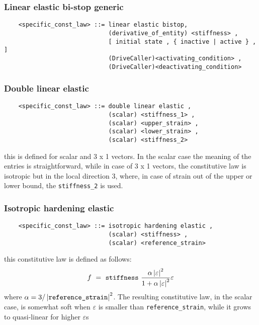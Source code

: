 \subsubsection{Linear elastic bi-stop generic}
\begin{verbatim}
    <specific_const_law> ::= linear elastic bistop,
                             (derivative_of_entity) <stiffness> ,
                             [ initial state , { inactive | active } , ]
                             (DriveCaller)<activating_condition> ,
                             (DriveCaller)<deactivating_condition>
\end{verbatim}
  
\subsubsection{Double linear elastic}
\begin{verbatim}
    <specific_const_law> ::= double linear elastic ,
                             (scalar) <stiffness_1> ,
                             (scalar) <upper_strain> ,
                             (scalar) <lower_strain> ,
                             (scalar) <stiffness_2>
\end{verbatim}
this is defined for scalar and 3 x 1 vectors. In the scalar case the
meaning of the entries is straightforward, while in case of 3 x 1 vectors,
the constitutive law is isotropic but in the local direction 3, where, in
case of strain out of the upper or lower bound, the \texttt{stiffness\_2} is
used.

\subsubsection{Isotropic hardening elastic}
\begin{verbatim}
    <specific_const_law> ::= isotropic hardening elastic ,
                             (scalar) <stiffness> ,
                             (scalar) <reference_strain>
\end{verbatim}
this constitutive law is defined as follows:
\begin{displaymath}
    f \ = \ \texttt{stiffness} \ \frac{
        \alpha\left| \varepsilon \right|^2
    }{
        1+\alpha\left| \varepsilon \right|^2
    }\varepsilon
\end{displaymath}
where $ \alpha=3/\left| \texttt{reference\_strain} \right|^2 $. The resulting
constitutive law, in the scalar case, is somewhat soft when
$ \varepsilon $ is smaller than \texttt{reference\_strain}, while it grows to
quasi-linear for higher $ \varepsilon$s

